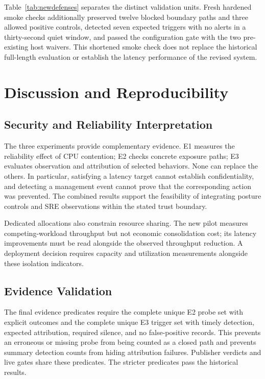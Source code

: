 \documentclass[conference,letterpaper]{IEEEtran}
\begin{document}
Table~\ref{tab:newdefenses} separates the distinct validation units. Fresh hardened smoke checks additionally preserved twelve blocked boundary paths and three allowed positive controls, detected seven expected triggers with no alerts in a thirty-second quiet window, and passed the configuration gate with the two pre-existing host waivers. This shortened smoke check does not replace the historical full-length evaluation or establish the latency performance of the revised system.

\section{Discussion and Reproducibility}
\subsection{Security and Reliability Interpretation}
The three experiments provide complementary evidence. E1 measures the reliability effect of CPU contention; E2 checks concrete exposure paths; E3 evaluates observation and attribution of selected behaviors. None can replace the others. In particular, satisfying a latency target cannot establish confidentiality, and detecting a management event cannot prove that the corresponding action was prevented. The combined results support the feasibility of integrating posture controls and SRE observations within the stated trust boundary.

Dedicated allocations also constrain resource sharing. The new pilot measures competing-workload throughput but not economic consolidation cost; its latency improvements must be read alongside the observed throughput reduction. A deployment decision requires capacity and utilization measurements alongside these isolation indicators.

\subsection{Evidence Validation}
The final evidence predicates require the complete unique E2 probe set with explicit outcomes and the complete unique E3 trigger set with timely detection, expected attribution, required silence, and no false-positive records. This prevents an erroneous or missing probe from being counted as a closed path and prevents summary detection counts from hiding attribution failures. Publisher verdicts and live gates share these predicates. The stricter predicates pass the historical results.
\end{document}
